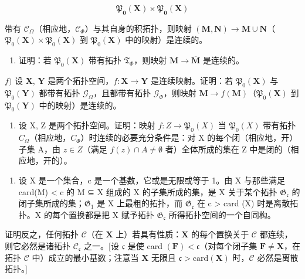 \[
\mathfrak {P} _ {\mathbf {0}} (\mathbf {X}) \times \mathfrak {P} _ {\mathbf {0}} (\mathbf {X})
\]

带有 \(\mathcal{C}_{\Omega}\)（相应地，\(\mathcal{C}_{\Phi}\)）与其自身的积拓扑，则映射 \((\mathbf{M}, \mathbf{N}) \to \mathbf{M} \cup \mathbf{N}\)（\(\mathfrak{P}_0(\mathbf{X}) \times \mathfrak{P}_0(\mathbf{X})\) 到 \(\mathfrak{P}_0(\mathbf{X})\) 中的映射）是连续的。

\begin{enumerate}
\def\labelenumi{\alph{enumi})}
\setcounter{enumi}{4}
\tightlist
\item
  证明：若 \(\mathfrak{P}_{0}(\mathbf{X})\) 带有拓扑 \(\mathfrak{T}_{\Phi}\)，则映射 \(\mathbf{M} \to \overline{\mathbf{M}}\) 是连续的。
\end{enumerate}

\(f)\) 设 \(\mathbf{X}\), \(\mathbf{Y}\) 是两个拓扑空间，\(f: \mathbf{X} \to \mathbf{Y}\) 是连续映射。证明：若 \(\mathfrak{P}_{0}(\mathbf{X})\) 与 \(\mathfrak{P}_{0}(\mathbf{Y})\) 都带有拓扑 \(\mathcal{G}_{\Omega}\)，且都带有拓扑 \(\mathcal{G}_{\Phi}\)，则映射 \(\mathbf{M} \to f(\mathbf{M})\)（\(\mathfrak{P}_{0}(\mathbf{X})\) 到 \(\mathfrak{P}_{0}(\mathbf{Y})\) 中的映射）是连续的。

\begin{enumerate}
\def\labelenumi{\alph{enumi})}
\setcounter{enumi}{6}
\tightlist
\item
  设 X, Z 是两个拓扑空间。证明：映射 \(f: Z \to \mathfrak{P}_{0}(X)\) 当 \(\mathfrak{P}_{0}(X)\) 带有拓扑 \(C_{\Omega}\)（相应地，\(C_{\Phi}\)）时连续的必要充分条件是：对 X 的每个闭（相应地，开）子集 A，由 \(z \in Z\)（满足 \(f(z) \cap A \neq \emptyset\) 者）全体所成的集在 Z 中是闭的（相应地，开的）。
\end{enumerate}

\begin{enumerate}
\def\labelenumi{\arabic{enumi})}
\setcounter{enumi}{7}
\tightlist
\item
  设 X 是一个集合，c 是一个基数，它或是无限或等于 1。由 X 与那些满足 card(M) \textless{} c 的 M ⊆ X 组成的 X 的子集所成的集，是 X 关于某个拓扑 \(\mathfrak{G}_{\mathfrak{c}}\) 的闭子集所成的集；\(\mathfrak{G}_{\mathfrak{1}}\) 是 X 上最粗的拓扑，而 \(\mathfrak{G}_{\mathfrak{c}}\) 在 c \textgreater{} card (X) 时是离散拓扑。X 的每个置换都是把 X 赋予拓扑 \(\mathfrak{G}_{\mathfrak{c}}\) 所得拓扑空间的一个自同构。
\end{enumerate}

证明反之，任何拓扑 \(\mathcal{C}\)（在 \(\mathbf{X}\) 上）若具有性质：\(\mathbf{X}\) 的每个置换关于 \(\mathcal{C}\) 都连续，则它必然是诸拓扑 \(\mathcal{C}_{\mathfrak{c}}\) 之一。{[}设 \(\mathfrak{c}\) 是使 card \((\mathbf{F}) < \mathfrak{c}\)（对每个闭子集 \(\mathbf{F} \neq \mathbf{X}\)，在拓扑 \(\mathcal{C}\) 中）成立的最小基数；注意当 \(\mathbf{X}\) 无限且 \(\mathfrak{c} >\mathrm{card}(\mathbf{X})\) 时，\(\mathcal{C}\) 必然是离散拓扑。{]}

